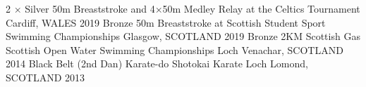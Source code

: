 

\begin{cvhonors}
  \cvhonor
    {2 × Silver} %
    {50m Breaststroke and 4×50m Medley Relay at the Celtics Tournament} %
    {Cardiff, WALES} %
    {2019} %
  \cvhonor
    {Bronze} %
    {50m Breaststroke at Scottish Student Sport Swimming Championships} %
    {Glasgow, SCOTLAND} %
    {2019} %
  \cvhonor
    {Bronze} %
    {2KM Scottish Gas Scottish Open Water Swimming Championships} %
    {Loch Venachar, SCOTLAND} %
    {2014} %
  \cvhonor
    {Black Belt (2nd Dan)} %
    {Karate-do Shotokai Karate} %
    {Loch Lomond, SCOTLAND} %
    {2013} %
\end{cvhonors}
